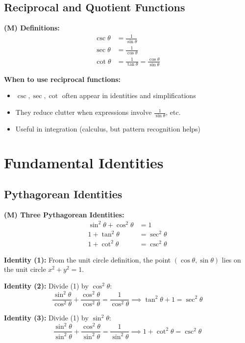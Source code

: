 \documentclass[12pt]{extarticle}
\begin{document}
\subsection{Reciprocal and Quotient Functions}

\begin{conceptbox}
\textbf{(M) Definitions:}
\begin{align*}
\csc\theta &= \frac{1}{\sin\theta} \\
\sec\theta &= \frac{1}{\cos\theta} \\
\cot\theta &= \frac{1}{\tan\theta} = \frac{\cos\theta}{\sin\theta}
\end{align*}
\end{conceptbox}

\begin{remarkbox}
\textbf{When to use reciprocal functions:}
\begin{itemize}
\item $\csc, \sec, \cot$ often appear in identities and simplifications
\item They reduce clutter when expressions involve $\frac{1}{\sin\theta}$, etc.
\item Useful in integration (calculus, but pattern recognition helps)
\end{itemize}
\end{remarkbox}

\section{Fundamental Identities}

\subsection{Pythagorean Identities}

\begin{theorembox}
\textbf{(M) Three Pythagorean Identities:}
\begin{align}
\sin^2\theta + \cos^2\theta &= 1 \\
1 + \tan^2\theta &= \sec^2\theta \\
1 + \cot^2\theta &= \csc^2\theta
\end{align}
\end{theorembox}

\begin{conceptbox}
\textbf{Identity (1):} From the unit circle definition, the point $(\cos\theta, \sin\theta)$ lies on the unit circle $x^2 + y^2 = 1$.

\textbf{Identity (2):} Divide (1) by $\cos^2\theta$:
\[
\frac{\sin^2\theta}{\cos^2\theta} + \frac{\cos^2\theta}{\cos^2\theta} = \frac{1}{\cos^2\theta} \implies \tan^2\theta + 1 = \sec^2\theta
\]

\textbf{Identity (3):} Divide (1) by $\sin^2\theta$:
\[
\frac{\sin^2\theta}{\sin^2\theta} + \frac{\cos^2\theta}{\sin^2\theta} = \frac{1}{\sin^2\theta} \implies 1 + \cot^2\theta = \csc^2\theta
\]
\end{conceptbox}
\end{document}
